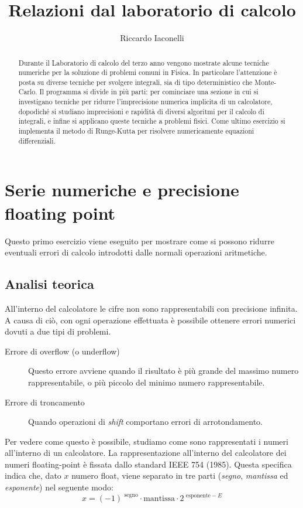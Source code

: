 \documentclass[a4paper,10pt]{article}
\title{Relazioni dal laboratorio di calcolo}
\author{Riccardo Iaconelli}
\begin{document}
\maketitle

\begin{abstract}
Durante il Laboratorio di calcolo del terzo anno vengono mostrate alcune tecniche numeriche per la soluzione di problemi comuni in Fisica. In particolare l'attenzione è posta su diverse tecniche per svolgere integrali, sia di tipo deterministico che Monte-Carlo. Il programma si divide in più parti: per cominciare una sezione in cui si investigano tecniche per ridurre l'imprecisione numerica implicita di un calcolatore, dopodiché si studiano imprecisioni e rapidità di diversi algoritmi per il calcolo di integrali, e infine si applicano queste tecniche a problemi fisici. Come ultimo esercizio si implementa il metodo di Runge-Kutta per risolvere numericamente equazioni differenziali.
\end{abstract}
\clearpage

\section{Serie numeriche e precisione floating point}
Questo primo esercizio viene eseguito per mostrare come si possono ridurre eventuali errori di calcolo introdotti dalle normali operazioni aritmetiche.

\subsection{Analisi teorica}
All'interno del calcolatore le cifre non sono rappresentabili con precisione infinita. A causa di ciò, con ogni operazione effettuata è possibile ottenere errori numerici dovuti a due tipi di problemi.
\begin{description}
 \item[Errore di overflow (o underflow)] Questo errore avviene quando il risultato è più grande del massimo numero rappresentabile, o più piccolo del minimo numero rappresentabile.
 \item[Errore di troncamento] Quando operazioni di \textit{shift} comportano errori di arrotondamento.
\end{description}

Per vedere come questo è possibile, studiamo come sono rappresentati i numeri all'interno di un calcolatore.
La rappresentazione all'interno del calcolatore dei numeri floating-point è fissata dallo standard IEEE 754 (1985).
Questa specifica indica che, dato $x$ numero float, viene separato in tre parti (\textit{segno}, \textit{mantissa} ed \textit{esponente}) nel seguente modo:
\begin{equation}
 x= (-1)^\text{\ segno} \cdot\text{mantissa}\cdot 2^{\text{\ esponente}-E}
\end{equation}
\end{document}
